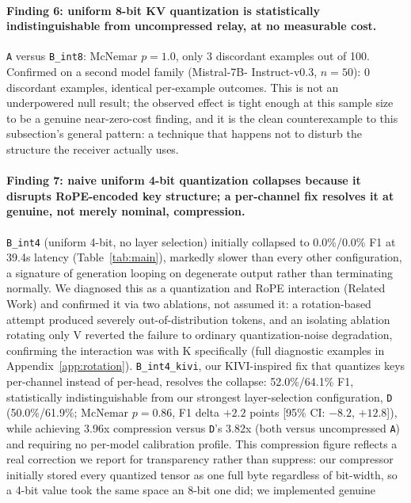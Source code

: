 \documentclass[11pt]{article}
\begin{document}
\paragraph{Finding 6: uniform 8-bit KV quantization is statistically
indistinguishable from uncompressed relay, at no measurable cost.}
\texttt{A} versus \texttt{B\_int8}: McNemar $p=1.0$, only 3 discordant
examples out of 100. Confirmed on a second model family (Mistral-7B-
Instruct-v0.3, $n=50$): 0 discordant examples, identical per-example
outcomes. This is not an underpowered null result; the observed effect is
tight enough at this sample size to be a genuine near-zero-cost finding,
and it is the clean counterexample to this subsection's general pattern:
a technique that happens not to disturb the structure the receiver
actually uses.

\paragraph{Finding 7: naive uniform 4-bit quantization collapses because
it disrupts RoPE-encoded key structure; a per-channel fix resolves it at
genuine, not merely nominal, compression.} \texttt{B\_int4} (uniform
4-bit, no layer selection) initially collapsed to 0.0\%/0.0\% F1 at
39.4s latency (Table~\ref{tab:main}), markedly slower than every other
configuration, a signature of generation looping on degenerate output
rather than terminating normally. We diagnosed this as a quantization and
RoPE interaction (Related Work) and confirmed it via two ablations, not
assumed it: a rotation-based attempt produced severely out-of-distribution
tokens, and an isolating ablation rotating only V reverted the failure to
ordinary quantization-noise degradation, confirming the interaction was
with K specifically (full diagnostic examples in
Appendix~\ref{app:rotation}). \texttt{B\_int4\_kivi}, our KIVI-inspired
fix that quantizes keys per-channel instead of per-head, resolves the
collapse: 52.0\%/64.1\% F1, statistically indistinguishable from our
strongest layer-selection configuration, \texttt{D} (50.0\%/61.9\%;
McNemar $p=0.86$, F1 delta $+2.2$ points [95\% CI: $-8.2$, $+12.8$]),
while achieving 3.96x compression versus \texttt{D}'s 3.82x (both versus
uncompressed \texttt{A}) and requiring no per-model calibration profile.
This compression figure reflects a real correction we report for
transparency rather than suppress: our compressor initially stored every
quantized tensor as one full byte regardless of bit-width, so a 4-bit
value took the same space an 8-bit one did; we implemented genuine
\end{document}
